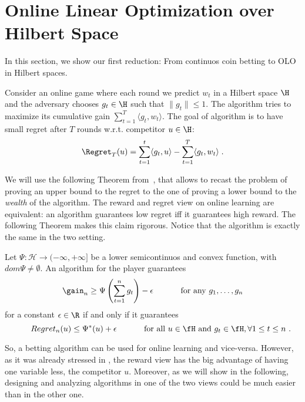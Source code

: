 \section{Online Linear Optimization over Hilbert Space}
\label{section:online-linear-optimization-hilbert-space}

In this section, we show our first reduction: From continuos coin betting to \ac{OLO} in Hilbert spaces.

Consider an online game where each round we predict $w_t$ in a Hilbert space
$\H$ and the adversary chooses $g_t \in \H$ such that $\|g_t\| \le 1$. The
algorithm tries to maximize its cumulative gain $\sum_{t=1}^T \langle g_t, w_t
\rangle$. The goal of algorithm is to have small regret after $T$ rounds w.r.t.
competitor $u \in \H$:
$$
\Regret_T(u) = \sum_{t=1}^t \langle g_t, u \rangle - \sum_{t=1}^T \langle g_t, w_t \rangle \; .
$$

We will use the following Theorem from~\citet{McMahanO14}, that allows to recast the problem of proving an upper bound to the regret to the one of proving a lower bound to the \emph{wealth} of the algorithm.
The reward and regret view on online learning are equivalent: an algorithm guarantees low regret iff it guarantees high reward. The following Theorem makes this claim rigorous. Notice that the algorithm is exactly the same in the two setting.
\begin{theorem}
  \label{thm:rrdual}
  Let $\Psi:\mathcal{H} \rightarrow (-\infty, +\infty]$ be a lower semicontinuos and convex function, with $dom \Psi \neq \emptyset$. An
  algorithm for the player guarantees
  \[
  \gain_n \geq \Psi\left(\sum_{t=1}^n g_t\right) - \epsilon \quad \quad \quad \textnormal{ for any } g_1, \dots, g_n
  \]
  for a constant $\epsilon \in \R$ if and only if it
  guarantees
  \begin{equation}\label{eq:regb}
  \qquad Regret_n(u) \leq \Psi^*(u) + \epsilon \quad \quad \quad \textnormal{ for all } u \in \fH \textnormal{ and } g_t \in \fH, \forall 1\leq t\leq n~.
  \end{equation}
\end{theorem}
So, a betting algorithm can be used for online learning and vice-versa. However, as it was already stressed in \citet{McMahanO14}, the reward view has the big advantage of having one variable less, the competitor $u$.
Moreover, as we will show in the following, designing and analyzing algorithms in one of the two views could be much easier than in the other one.

